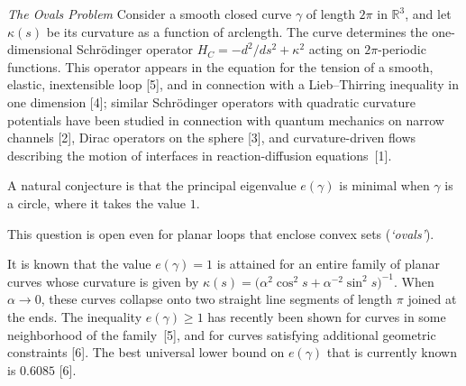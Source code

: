 \documentclass[12pt,letterpaper, reqno]{amsart}
\begin{document}
\begin{problemblock}
  \emph{The Ovals Problem} %
Consider a smooth closed curve $\gamma$ of length $2\pi$ in
${\mathbb R}^3$, and let  $\kappa(s)$ be its curvature as a function
of arclength. The curve determines the one-dimensional Schr\"odinger
operator $H_C=-d^2/ds^2 + \kappa^2$ acting on $2\pi$-periodic
functions. This operator appears in the equation for the tension of
a smooth, elastic, inextensible loop [5], and in connection with a
Lieb--Thirring inequality in one dimension [4]; similar
Schr\"odinger operators with quadratic curvature potentials have
been studied in connection with quantum mechanics on narrow channels
[2], Dirac operators on the sphere [3], and curvature-driven flows
describing the motion of interfaces in reaction-diffusion
equations~[1].

\begin{problem}
A natural conjecture is that the principal eigenvalue $e(\gamma)$ is
minimal when $\gamma$ is a circle, where it takes the value $1$.
\end{problem}

This question is open even for planar loops that enclose convex sets
(\emph{`ovals'}).

\begin{remark}
 It is known that the value $e(\gamma)=1$ is
attained for an entire family of planar curves whose curvature is
given by $\kappa(s) = \bigl(\alpha^2\cos^2 s + \alpha^{-2}\sin^2 s
\bigr)^{-1}$. When $\alpha\to 0$, these curves collapse onto two
straight line segments of length $\pi$ joined at the ends. The
inequality $e(\gamma)\ge 1$ has recently been shown for curves in
some neighborhood of the family~[5], and for curves satisfying
additional geometric constraints [6]. The best universal lower bound
on $e(\gamma)$ that is currently known is $0.6085$ [6].

\end{remark}


\end{problemblock}
\end{document}
